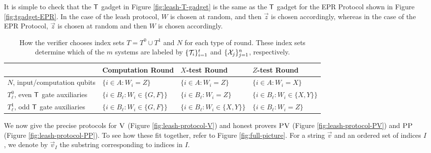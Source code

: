 \documentclass[11pt]{article}
\theoremstyle{remark}
\theoremstyle{definition}
\newcommand{\ver}{\textsc{V}}
\newcommand{\pv}{\textsc{PV}}
\newcommand{\pp}{\textsc{PP}}
\begin{document}
It is simple to check that the $\sf T$ gadget in Figure \ref{fig:leash-T-gadget} is the same as the $\sf T$ gadget for the EPR Protocol shown in Figure \ref{fig:tgadget-EPR}. In the case of the leash protocol, $W$ is chosen at random, and then $\vec{z}$ is chosen accordingly, whereas in the case of the EPR Protocol, $\vec{z}$ is chosen at random and then $W$ is chosen accordingly. 




\begin{table}
\centering
\setlength\tabcolsep{1.5pt}
\begin{tabular}{|l|lll|}
\hline
& Computation Round & $X$-test Round & $Z$-test Round\\
\hline
$N$, input/computation qubits & $\{i\in A:W_i=Z\}$ & $\{i\in A:W_i=Z\}$ & $\{i\in A:W_i=X\}$\\
$T^0_{\ell}$, even $\sf T$ gate auxiliaries & $\{i\in B_{\ell}:W_i\in \{G,F\}\}$ & $\{i\in B_{\ell}:W_i=Z\}$ & $\{i\in B_{\ell}:W_i\in \{X,Y\}\}$ \\
$T^1_{\ell}$, odd $\sf T$ gate auxiliaries & $\{i\in B_{\ell}:W_i\in \{G,F\}\}$ & $\{i\in B_{\ell}:W_i\in \{X,Y\}\}$ & $\{i\in B_{\ell}:W_i=Z\}$ \\
\hline
\end{tabular}
\caption{How the verifier chooses index sets $T=T^0\cup T^1$ and $N$ for each type of round. These index sets determine which of the $m$ systems are labeled by $\{{\cal T}_{i}\}_{i=1}^t$ and $\{{\cal X}_{j}\}_{j=1}^n$, respectively.}\label{tab:index-choices}
\end{table}

We now give the precise protocols for $\ver$ (Figure \ref{fig:leash-protocol-V}) and honest provers $\pv$ (Figure \ref{fig:leash-protocol-PV}) and $\pp$ (Figure \ref{fig:leash-protocol-PP}). To see how these fit together, refer to Figure \ref{fig:full-picture}. For a string $\vec{v}$ and an ordered set of indices $I$, we denote by $\vec{v}_I$ the substring corresponding to indices in $I$.
\end{document}
